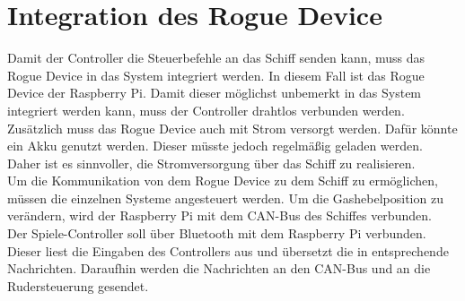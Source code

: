 \section{Integration des Rogue Device}
Damit der Controller die Steuerbefehle an das Schiff senden kann, muss das Rogue Device in das System integriert werden.
In diesem Fall ist das Rogue Device der Raspberry Pi. Damit dieser möglichst unbemerkt in das System integriert werden kann,
muss der Controller drahtlos verbunden werden. Zusätzlich muss das Rogue Device auch mit Strom versorgt werden. 
Dafür könnte ein Akku genutzt werden. Dieser müsste jedoch regelmäßig geladen werden. Daher ist es sinnvoller, die Stromversorgung
über das Schiff zu realisieren. 
 \\
Um die Kommunikation von dem Rogue Device zu dem Schiff zu ermöglichen, müssen
die einzelnen Systeme angesteuert werden. Um die Gashebelposition zu verändern, wird der Raspberry Pi mit dem CAN-Bus des Schiffes
verbunden. \\
Der Spiele-Controller soll über Bluetooth mit dem Raspberry Pi verbunden. Dieser liest die Eingaben des Controllers aus und
übersetzt die in entsprechende Nachrichten. Daraufhin werden die Nachrichten an den CAN-Bus und an die Rudersteuerung gesendet.

